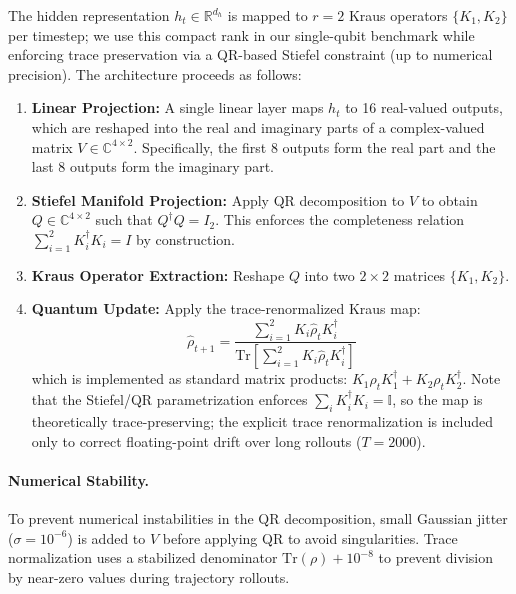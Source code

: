 \documentclass{article} %
\providecommand{\Id}{\mathbb{I}}
\begin{document}
The hidden representation $h_t \in \mathbb{R}^{d_h}$ is mapped to $r=2$ Kraus operators $\{K_1, K_2\}$ per timestep; we use this compact rank in our single-qubit benchmark while enforcing trace preservation via a QR-based Stiefel constraint (up to numerical precision). The architecture proceeds as follows:

\begin{enumerate}
    \item \textbf{Linear Projection:} A single linear layer maps $h_t$ to 16 real-valued outputs, which are reshaped into the real and imaginary parts of a complex-valued matrix $V \in \mathbb{C}^{4 \times 2}$. Specifically, the first 8 outputs form the real part and the last 8 outputs form the imaginary part.
    
    \item \textbf{Stiefel Manifold Projection:} Apply QR decomposition to $V$ to obtain $Q \in \mathbb{C}^{4 \times 2}$ such that $Q^\dagger Q = I_2$. This enforces the completeness relation $\sum_{i=1}^{2} K_i^\dagger K_i = I$ by construction.
    
    \item \textbf{Kraus Operator Extraction:} Reshape $Q$ into two $2 \times 2$ matrices $\{K_1, K_2\}$.
    
    \item \textbf{Quantum Update:} Apply the trace-renormalized Kraus map:
    \begin{equation}
    \hat{\rho}_{t+1} = \frac{\sum_{i=1}^{2} K_i \hat{\rho}_t K_i^\dagger}{\text{Tr}\left[\sum_{i=1}^{2} K_i \hat{\rho}_t K_i^\dagger\right]}
    \end{equation}
    which is implemented as standard matrix products: $K_1 \rho_t K_1^\dagger + K_2 \rho_t K_2^\dagger$. Note that the Stiefel/QR parametrization enforces $\sum_i K_i^\dagger K_i=\Id$, so the map is theoretically trace-preserving; the explicit trace renormalization is included only to correct floating-point drift over long rollouts ($T=2000$).
\end{enumerate}

\paragraph{Numerical Stability.}
To prevent numerical instabilities in the QR decomposition, small Gaussian jitter ($\sigma = 10^{-6}$) is added to $V$ before applying QR to avoid singularities. Trace normalization uses a stabilized denominator $\text{Tr}(\rho) + 10^{-8}$ to prevent division by near-zero values during trajectory rollouts.
\end{document}
